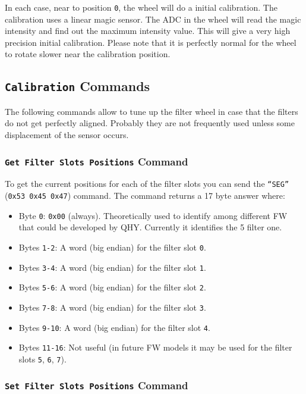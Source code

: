 \documentclass[a4paper,10pt]{article}
\begin{document}
In each case, near to position \texttt{0}, the wheel will do a initial calibration. The calibration uses a linear magic sensor. The ADC in the wheel will read the magic intensity and find out the maximum intensity value. This will give a very high precision initial calibration. Please note that it is perfectly normal for the wheel to rotate slower near the calibration position.


\subsection{\texttt{Calibration} Commands}

The following commands allow to tune up the filter wheel in case that the filters do not get perfectly aligned. Probably they are not frequently used unless some displacement of the sensor occurs.

\subsubsection{\texttt{Get Filter Slots Positions} Command}

To get the current positions for each of the filter slots you can send the \texttt{``SEG''} (\texttt{0x53 0x45 0x47}) command. The command returns a 17 byte answer where:

\begin{itemize}
 \item Byte \texttt{0}: \texttt{0x00} (always). Theoretically used to identify among different FW that could be developed by QHY. Currently it identifies the 5 filter one.
 
 \item Bytes \texttt{1-2}: A word (big endian) for the filter slot \texttt{0}.
 \item Bytes \texttt{3-4}: A word (big endian) for the filter slot \texttt{1}.
 \item Bytes \texttt{5-6}: A word (big endian) for the filter slot \texttt{2}.
 \item Bytes \texttt{7-8}: A word (big endian) for the filter slot \texttt{3}.
 \item Bytes \texttt{9-10}: A word (big endian) for the filter slot \texttt{4}.
 \item Bytes \texttt{11-16}: Not useful (in future FW models it may be used for the filter slots \texttt{5}, \texttt{6}, \texttt{7}).
\end{itemize}


\subsubsection{\texttt{Set Filter Slots Positions} Command}
\end{document}
